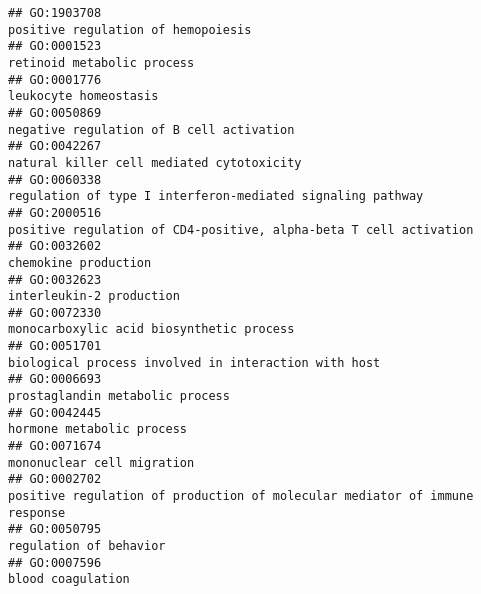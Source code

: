 \documentclass[
]{article}
\begin{document}
\begin{verbatim}
## GO:1903708                                                                                                               positive regulation of hemopoiesis
## GO:0001523                                                                                                                       retinoid metabolic process
## GO:0001776                                                                                                                            leukocyte homeostasis
## GO:0050869                                                                                                         negative regulation of B cell activation
## GO:0042267                                                                                                        natural killer cell mediated cytotoxicity
## GO:0060338                                                                                       regulation of type I interferon-mediated signaling pathway
## GO:2000516                                                                                positive regulation of CD4-positive, alpha-beta T cell activation
## GO:0032602                                                                                                                             chemokine production
## GO:0032623                                                                                                                         interleukin-2 production
## GO:0072330                                                                                                         monocarboxylic acid biosynthetic process
## GO:0051701                                                                                             biological process involved in interaction with host
## GO:0006693                                                                                                                  prostaglandin metabolic process
## GO:0042445                                                                                                                        hormone metabolic process
## GO:0071674                                                                                                                       mononuclear cell migration
## GO:0002702                                                                       positive regulation of production of molecular mediator of immune response
## GO:0050795                                                                                                                           regulation of behavior
## GO:0007596                                                                                                                                blood coagulation

\end{verbatim}
\end{document}
